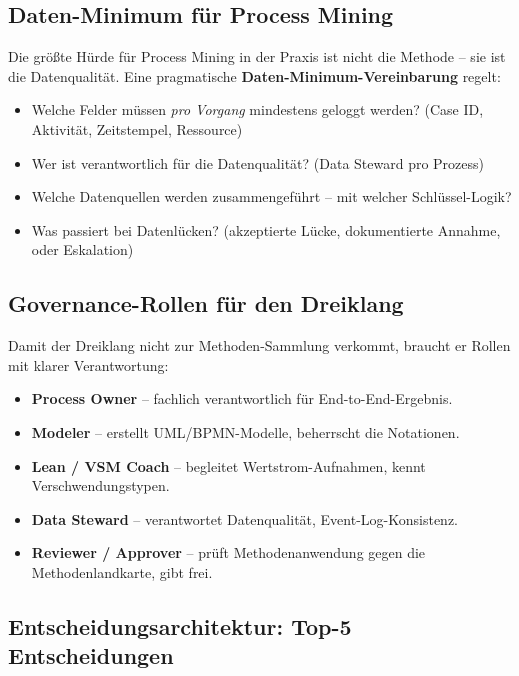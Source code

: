 \documentclass[11pt,a4paper,oneside]{article}
\newcommand{\fachbegriff}[1]{\textbf{#1}}
\begin{document}
\subsection{Daten-Minimum für Process Mining}

Die größte Hürde für Process Mining in der Praxis ist nicht die Methode -- sie ist die Datenqualität. Eine pragmatische \fachbegriff{Daten-Minimum-Vereinbarung} regelt:

\begin{itemize}
  \item Welche Felder müssen \emph{pro Vorgang} mindestens geloggt werden? (Case ID, Aktivität, Zeitstempel, Ressource)
  \item Wer ist verantwortlich für die Datenqualität? (Data Steward pro Prozess)
  \item Welche Datenquellen werden zusammengeführt -- mit welcher Schlüssel-Logik?
  \item Was passiert bei Datenlücken? (akzeptierte Lücke, dokumentierte Annahme, oder Eskalation)
\end{itemize}

\subsection{Governance-Rollen für den Dreiklang}

Damit der Dreiklang nicht zur Methoden-Sammlung verkommt, braucht er Rollen mit klarer Verantwortung:

\begin{itemize}
  \item \fachbegriff{Process Owner} -- fachlich verantwortlich für End-to-End-Ergebnis.
  \item \fachbegriff{Modeler} -- erstellt UML/BPMN-Modelle, beherrscht die Notationen.
  \item \fachbegriff{Lean / VSM Coach} -- begleitet Wertstrom-Aufnahmen, kennt Verschwendungstypen.
  \item \fachbegriff{Data Steward} -- verantwortet Datenqualität, Event-Log-Konsistenz.
  \item \fachbegriff{Reviewer / Approver} -- prüft Methodenanwendung gegen die Methodenlandkarte, gibt frei.
\end{itemize}

\subsection{Entscheidungsarchitektur: Top-5 Entscheidungen}
\end{document}
